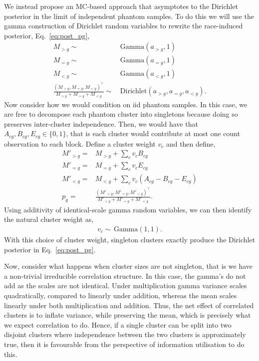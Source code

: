 \documentclass[pdflatex,sn-basic,icol]{sn-jnl}
\theoremstyle{plain}
\theoremstyle{definition}
\begin{document}
We instead propose an MC-based approach that asymptotes to the Dirichlet posterior in the limit of independent phantom samples.
To do this we will use the gamma construction of Dirichlet random variables to rewrite the race-induced posterior, Eq.~\ref{eq:post_pg},
\begin{align}
    M_{>g} \sim&\, \mathrm{Gamma}(a_{>g}, 1)\\
    M_{=g} \sim&\, \mathrm{Gamma}(a_{=g}, 1)\\
    M_{<g} \sim&\, \mathrm{Gamma}(a_{<g}, 1)\\
    \frac{(M_{>g}, M_{=g}, M_{<g})^\top}{M_{>g} + M_{=g} + M_{<g}} \sim&\, \mathrm{Dirichlet}(a_{>g}, a_{=g}, a_{<g}).\label{eq:gamma_dir}
\end{align}
Now consider how we would condition on iid phantom samples.
In this case, we are free to decompose each phantom cluster into singletons because doing so preserves inter-cluster independence.
Then, we would have that $A_{cg}, B_{cg}, E_{cg} \in \{0, 1\}$, that is each cluster would contribute at most one count observation to each block.
Define a cluster weight $v_c$ and then define,
\begin{align}
    M'_{>g} =& M_{>g} + \sum_c v_c B_{cg}\\
    M'_{=g} =& M_{=g} + \sum_c v_c E_{cg}\\
    M'_{<g} =& M_{<g} + \sum_c v_c (A_{cg} - B_{cg} - E_{cg})\\
    p_g =& \frac{(M'_{>g}, M'_{=g}, M'_{<g})^\top}{M'_{>g} + M'_{=g} + M'_{<g}}.
\end{align}
Using additivity of identical-scale gamma random variables, we can then identify the natural cluster weight as,
\begin{align}
    v_c \sim\, \mathrm{Gamma}(1, 1).
\end{align}
With this choice of cluster weight, singleton clusters exactly produce the Dirichlet posterior in Eq.~\ref{eq:post_pg}.

Now, consider what happens when cluster sizes are not singleton, that is we have a non-trivial irreducible correlation structure.
In this case, the gamma's do not add as the scales are not identical.
Under multiplication gamma variance scales quadratically, compared to linearly under addition, whereas the mean scales linearly under both multiplication and addition.
Thus, the net effect of correlated clusters is to inflate variance, while preserving the mean, which is precisely what we expect correlation to do.
Hence, if a single cluster can be split into two disjoint clusters where independence between the two clusters is approximately true, then it is favourable from the perspective of information utilisation to do this.
\end{document}
